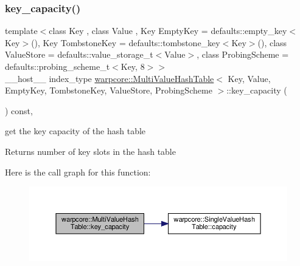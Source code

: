 \subsubsection{\texorpdfstring{key\+\_\+capacity()}{key\_capacity()}}
{\footnotesize\ttfamily template$<$class Key , class Value , Key Empty\+Key = defaults\+::empty\+\_\+key$<$\+Key$>$(), Key Tombstone\+Key = defaults\+::tombstone\+\_\+key$<$\+Key$>$(), class Value\+Store  = defaults\+::value\+\_\+storage\+\_\+t$<$\+Value$>$, class Probing\+Scheme  = defaults\+::probing\+\_\+scheme\+\_\+t$<$\+Key, 8$>$$>$ \\
\+\_\+\+\_\+host\+\_\+\+\_\+ index\+\_\+type \hyperlink{classwarpcore_1_1MultiValueHashTable}{warpcore\+::\+Multi\+Value\+Hash\+Table}$<$ Key, Value, Empty\+Key, Tombstone\+Key, Value\+Store, Probing\+Scheme $>$\+::key\+\_\+capacity (\begin{DoxyParamCaption}{ }\end{DoxyParamCaption}) const\hspace{0.3cm}{\ttfamily [inline]}, {\ttfamily [noexcept]}}



get the key capacity of the hash table 

\begin{DoxyReturn}{Returns}
number of key slots in the hash table 
\end{DoxyReturn}
Here is the call graph for this function\+:
\nopagebreak
\begin{figure}[H]
\begin{center}
\leavevmode
\includegraphics[width=350pt]{classwarpcore_1_1MultiValueHashTable_aabaa179a3e1b49f37f1a23adb0b33092_cgraph}
\end{center}
\end{figure}
\mbox{\label{classwarpcore_1_1MultiValueHashTable_a3c84877469284ea0edfe5a0b62abe765}} 
